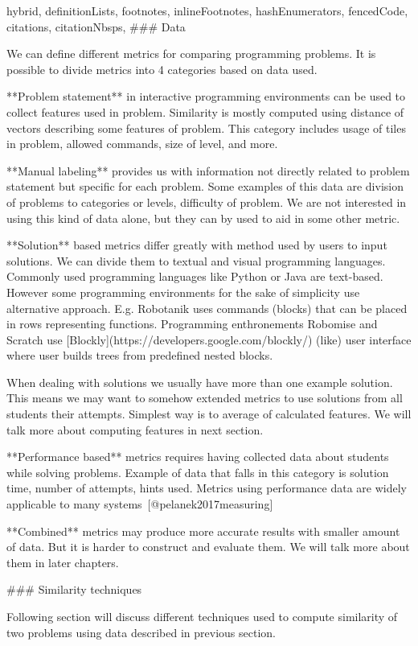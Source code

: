 \documentclass[
  digital, %
  table,   %
  nolof,     %
  nolot,     %
  nocover
]{fithesis3}
\begin{document}
\begin{markdown*}{%
  hybrid,
  definitionLists,
  footnotes,
  inlineFootnotes,
  hashEnumerators,
  fencedCode,
  citations,
  citationNbsps,
}
### Data

We can define different metrics for comparing programming problems. It is possible to divide metrics into 4 categories based on data used.

**Problem statement** in interactive programming environments can be used to collect features used in problem. Similarity is mostly computed using distance of vectors describing some features of problem. This category includes usage of tiles in problem, allowed commands, size of level, and more.

**Manual labeling** provides us with information not directly related to problem statement but specific for each problem. Some examples of this data are division of problems to categories or levels, difficulty of problem. We are not interested in using this kind of data alone, but they can by used to aid in some other metric.

**Solution** based metrics differ greatly with method used by users to input solutions. We can divide them to textual and visual programming languages. Commonly used programming languages like Python or Java are text-based. However some programming environments for the sake of simplicity use alternative approach. E.g. Robotanik uses commands (blocks) that can be placed in rows representing functions. Programming enthronements Robomise and Scratch use [Blockly](https://developers.google.com/blockly/) (like) user interface where user builds trees from predefined nested blocks.

When dealing with solutions we usually have more than one example solution. This means we may want to somehow extended metrics to use solutions from all students their attempts. Simplest way is to average of calculated features. We will talk more about computing features in next section.

**Performance based** metrics requires having collected data about students while solving problems. Example of data that falls in this category is solution time, number of attempts, hints used. Metrics using performance data are widely applicable to many systems~[@pelanek2017measuring]

**Combined** metrics may produce more accurate results with smaller amount of data. But it is harder to construct and evaluate them. We will talk more about them in later chapters.

### Similarity techniques

Following section will discuss different techniques used to compute similarity of two problems using data described in previous section.


\end{markdown*}
\end{document}
